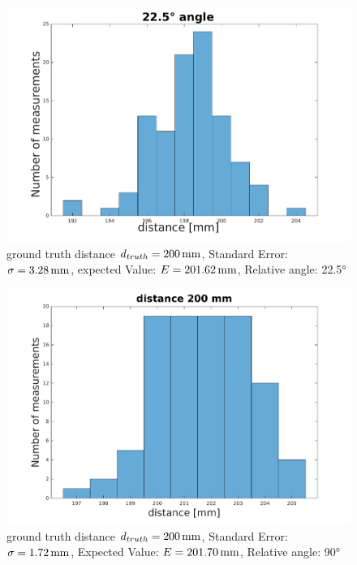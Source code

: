\begin{figure}
	\centering
	\includegraphics[width=0.9\linewidth]{pictures/plot_angles_22.pdf}
	\caption{ground truth distance $d_{truth}= \unit[200]{mm}$, Standard Error: $\sigma=\unit[3.28]{mm}$, expected Value: $E=\unit[201.62]{mm}$, Relative angle: 22.5°}
	\label{fig:angle22.5}
\end{figure}

\begin{figure}
	\centering
	\includegraphics[width=0.9\linewidth]{pictures/plot_dist200.pdf}
	\caption{ground truth distance $d_{truth}= \unit[200]{mm}$, Standard Error: $\sigma=\unit[1.72]{mm}$, Expected Value: $E=\unit[201.70]{mm}$, Relative angle: 90°}
	\label{fig:dist200}
\end{figure}

